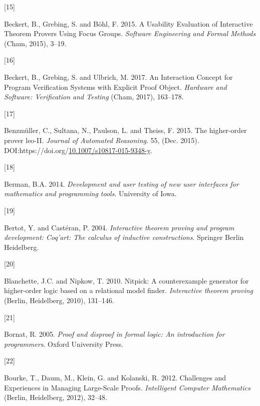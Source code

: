 \documentclass[
]{article}
\newlength{\cslhangindent}
\newlength{\csllabelwidth}
\newlength{\cslentryspacingunit} %
\newenvironment{CSLReferences}[2] %
 {%
  \setlength{\parindent}{0pt}
  \ifodd #1
  \let\oldpar\par
  \def\par{\hangindent=\cslhangindent\oldpar}
  \fi
  \setlength{\parskip}{#2\cslentryspacingunit}
 }%
 {}
\newcommand{\CSLLeftMargin}[1]{\parbox[t]{\csllabelwidth}{#1}}
\newcommand{\CSLRightInline}[1]{\parbox[t]{\linewidth - \csllabelwidth}{#1}\break}
\begin{document}
\begin{CSLReferences}{0}{0}
\leavevmode{}%
\CSLLeftMargin{{[}15{]} }
\CSLRightInline{Beckert, B., Grebing, S. and Böhl, F. 2015. A
{Usability} {Evaluation} of {Interactive} {Theorem} {Provers} {Using}
{Focus} {Groups}. \emph{Software {Engineering} and {Formal} {Methods}}
(Cham, 2015), 3--19.}

\leavevmode{}%
\CSLLeftMargin{{[}16{]} }
\CSLRightInline{Beckert, B., Grebing, S. and Ulbrich, M. 2017. An
{Interaction} {Concept} for {Program} {Verification} {Systems} with
{Explicit} {Proof} {Object}. \emph{Hardware and {Software}:
{Verification} and {Testing}} (Cham, 2017), 163--178.}

\leavevmode{}%
\CSLLeftMargin{{[}17{]} }
\CSLRightInline{Benzmüller, C., Sultana, N., Paulson, L. and Theiss, F.
2015. The higher-order prover leo-II. \emph{Journal of Automated
Reasoning}. 55, (Dec. 2015).
DOI:https://doi.org/\href{https://doi.org/10.1007/s10817-015-9348-y}{10.1007/s10817-015-9348-y}.}

\leavevmode{}%
\CSLLeftMargin{{[}18{]} }
\CSLRightInline{Berman, B.A. 2014. \emph{Development and user testing of
new user interfaces for mathematics and programming tools}. University
of Iowa.}

\leavevmode{}%
\CSLLeftMargin{{[}19{]} }
\CSLRightInline{Bertot, Y. and Castéran, P. 2004. \emph{Interactive
theorem proving and program development: Coq'art: The calculus of
inductive constructions}. Springer Berlin Heidelberg.}

\leavevmode{}%
\CSLLeftMargin{{[}20{]} }
\CSLRightInline{Blanchette, J.C. and Nipkow, T. 2010. Nitpick: A
counterexample generator for higher-order logic based on a relational
model finder. \emph{Interactive theorem proving} (Berlin, Heidelberg,
2010), 131--146.}

\leavevmode{}%
\CSLLeftMargin{{[}21{]} }
\CSLRightInline{Bornat, R. 2005. \emph{Proof and disproof in formal
logic: An introduction for programmers}. Oxford University Press.}

\leavevmode{}%
\CSLLeftMargin{{[}22{]} }
\CSLRightInline{Bourke, T., Daum, M., Klein, G. and Kolanski, R. 2012.
Challenges and {Experiences} in {Managing} {Large}-{Scale} {Proofs}.
\emph{Intelligent {Computer} {Mathematics}} (Berlin, Heidelberg, 2012),
32--48.}


\end{CSLReferences}
\end{document}
